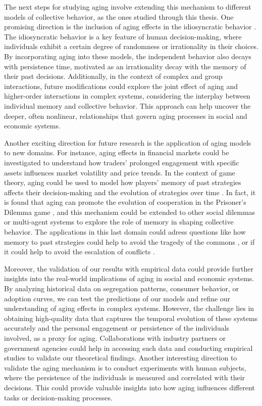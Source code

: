 The next steps for studying aging involve extending this mechanism to different models of collective behavior, as the ones studied through this thesis. One promising direction is the inclusion of aging effects in the idiosyncratic behavior \cite{vieira2023noisy,llabres2024aging}. The idiosyncratic behavior is a key feature of human decision-making, where individuals exhibit a certain degree of randomness or irrationality in their choices. By incorporating aging into these models, the independent behavior also decays with persistence time, motivated as an irrationality decay with the memory of their past decisions. Additionally, in the context of complex and group interactions, future modifications could explore the joint effect of aging and higher-order interactions in complex systems, considering the interplay between individual memory and collective behavior. This approach can help uncover the deeper, often nonlinear, relationships that govern aging processes in social and economic systems. 

Another exciting direction for future research is the application of aging models to new domains. For instance, aging effects in financial markets could be investigated to understand how traders' prolonged engagement with specific assets influences market volatility and price trends. In the context of game theory, aging could be used to model how players' memory of past strategies affects their decision-making and the evolution of strategies over time \cite{samuele-ciardella-2023}. In fact, it is found that aging can promote the evolution of cooperation in the Prisoner's Dilemma game \cite{attila-2009}, and this mechanism could be extended to other social dilemmas or multi-agent systems to explore the role of memory in shaping collective behavior. The applications in this last domain could adress questions like how memory to past strategies could help to avoid the tragedy of the commons \cite{ostrom1990governing}, or if it could help to avoid the escalation of conflicts \cite{axelrod1981evolution}.

Moreover, the validation of our results with empirical data could provide further insights into the real-world implications of aging in social and economic systems. By analyzing historical data on segregation patterns, consumer behavior, or adoption curves, we can test the predictions of our models and refine our understanding of aging effects in complex systems. However, the challenge lies in obtaining high-quality data that captures the temporal evolution of these systems accurately and the personal engagement or persistence of the individuals involved, as a proxy for aging. Collaborations with industry partners or government agencies could help in accessing such data and conducting empirical studies to validate our theoretical findings. Another interesting direction to validate the aging mechanism is to conduct experiments with human subjects, where the persistence of the individuals is measured and correlated with their decisions. This could provide valuable insights into how aging influences different tasks or decision-making processes.

